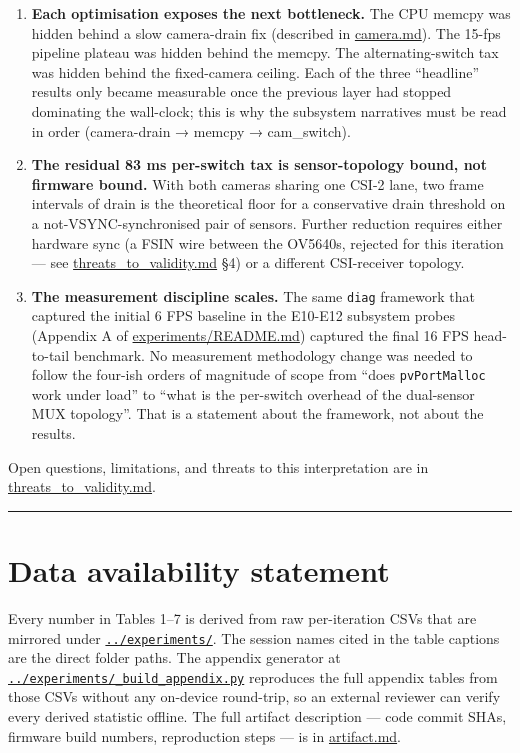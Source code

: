 \begin{enumerate}
\def\labelenumi{\arabic{enumi}.}
\tightlist
\item
  \textbf{Each optimisation exposes the next bottleneck.} The CPU memcpy
  was hidden behind a slow camera-drain fix (described in
  \url{camera.md}). The 15-fps pipeline plateau was hidden behind the
  memcpy. The alternating-switch tax was hidden behind the fixed-camera
  ceiling. Each of the three ``headline'' results only became measurable
  once the previous layer had stopped dominating the wall-clock; this is
  why the subsystem narratives must be read in order (camera-drain →
  memcpy → cam\_switch).
\item
  \textbf{The residual 83 ms per-switch tax is sensor-topology bound,
  not firmware bound.} With both cameras sharing one CSI-2 lane, two
  frame intervals of drain is the theoretical floor for a conservative
  drain threshold on a not-VSYNC-synchronised pair of sensors. Further
  reduction requires either hardware sync (a FSIN wire between the
  OV5640s, rejected for this iteration --- see
  \url{threats_to_validity.md} §4) or a different CSI-receiver topology.
\item
  \textbf{The measurement discipline scales.} The same \texttt{diag}
  framework that captured the initial 6 FPS baseline in the E10-E12
  subsystem probes (Appendix A of
  \href{../experiments/README.md}{experiments/README.md}) captured the
  final 16 FPS head-to-tail benchmark. No measurement methodology change
  was needed to follow the four-ish orders of magnitude of scope from
  ``does \texttt{pvPortMalloc} work under load'' to ``what is the
  per-switch overhead of the dual-sensor MUX topology''. That is a
  statement about the framework, not about the results.
\end{enumerate}

Open questions, limitations, and threats to this interpretation are in
\url{threats_to_validity.md}.

\begin{center}\rule{0.5\linewidth}{0.5pt}\end{center}

\section{Data availability statement}\label{data-availability-statement}

Every number in Tables 1--7 is derived from raw per-iteration CSVs that
are mirrored under \href{../experiments/}{\texttt{../experiments/}}. The
session names cited in the table captions are the direct folder paths.
The appendix generator at
\href{../experiments/_build_appendix.py}{\texttt{../experiments/\_build\_appendix.py}}
reproduces the full appendix tables from those CSVs without any
on-device round-trip, so an external reviewer can verify every derived
statistic offline. The full artifact description --- code commit SHAs,
firmware build numbers, reproduction steps --- is in \url{artifact.md}.
